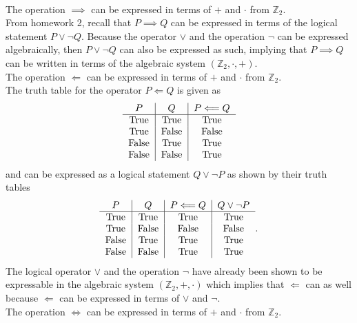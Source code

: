 \documentclass{article}
\begin{document}
\\[0.05in] The operation $\implies$ can be expressed in terms of $+$ and $\cdot$ from $\mathbb{Z}_2$. 
\\[0.05in] From homework 2, recall that $P \implies Q$ can be expressed in terms of the logical statement $P \vee \neg Q$. Because the operator $\vee$ and the operation $\neg$ can be expressed algebraically, then $P \vee \neg Q$ can also be expressed as such, implying that $P \implies Q$ can be written in terms of the algebraic system $(\mathbb{Z}_2, \cdot, +)$.
\\[0.05in] The operation $\Longleftarrow$ can be expressed in terms of $+$ and $\cdot$ from $\mathbb{Z}_2$. 
\\[0.05in] The truth table for the operator $P \Longleftarrow Q$ is given as
\begin{equation*}
\begin{tabular}{c|c|c}
$P$ & $Q$ & $P \Longleftarrow Q$ \\ \hline
True & True & True   \\
True & False & False \\
False & True & True  \\
False & False & True \\
\end{tabular}
\end{equation*}
and can be expressed as a logical statement $Q\vee \neg P$ as shown by their truth tables
\begin{equation*}
\begin{tabular}{c|c|c|c}
$P$ & $Q$ & $P \Longleftarrow Q$ & $Q\vee \neg P$ \\ \hline
True & True   & True  & True  \\
True & False  & False & False \\
False & True  & True  & True  \\
False & False & True  & True  \\
\end{tabular}.
\end{equation*}
The logical operator $\vee$ and the operation $\neg$ have already been shown to be expressable in the algebraic system $(\mathbb{Z}_2,+,\cdot)$ which implies that $\Longleftarrow$ can as well because $\Longleftarrow$ can be expressed in terms of $\vee$ and $\neg$. 
\\[0.05in] The operation $\Longleftrightarrow$ can be expressed in terms of $+$ and $\cdot$ from $\mathbb{Z}_2$. 
\end{document}

